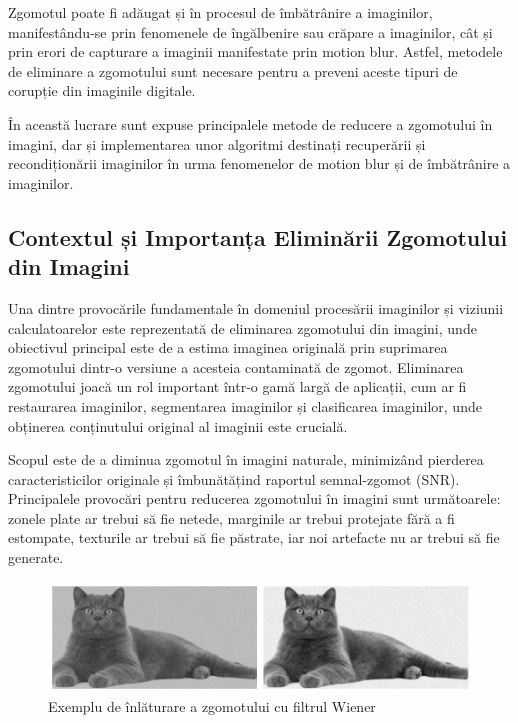 \documentclass[12pt]{article}
\begin{document}
Zgomotul poate fi adăugat și în procesul de îmbătrânire a imaginilor, manifestându-se prin fenomenele de îngălbenire sau crăpare a imaginilor, cât și prin erori de capturare a imaginii manifestate prin motion blur. Astfel, metodele de eliminare a zgomotului sunt necesare pentru a preveni aceste tipuri de corupție din imaginile digitale.

În această lucrare sunt expuse principalele metode de reducere a zgomotului în imagini, dar și implementarea unor algoritmi destinați recuperării și recondiționării imaginilor în urma fenomenelor de motion blur și de îmbătrânire a imaginilor.

\subsection{Contextul și Importanța Eliminării Zgomotului din Imagini}

\indent Una dintre provocările fundamentale în domeniul procesării imaginilor și viziunii calculatoarelor este reprezentată de eliminarea zgomotului din imagini, unde obiectivul principal este de a estima imaginea originală prin suprimarea zgomotului dintr-o versiune a acesteia contaminată de zgomot. Eliminarea zgomotului joacă un rol important într-o gamă largă de aplicații, cum ar fi restaurarea imaginilor, segmentarea imaginilor și clasificarea imaginilor, unde obținerea conținutului original al imaginii este crucială.

\indent Scopul este de a diminua zgomotul în imagini naturale, minimizând pierderea caracteristicilor originale și îmbunătățind raportul semnal-zgomot (SNR). Principalele provocări pentru reducerea zgomotului în imagini sunt următoarele: zonele plate ar trebui să fie netede, marginile ar trebui protejate fără a fi estompate, texturile ar trebui să fie păstrate, iar noi artefacte nu ar trebui să fie generate.

\begin{figure}[h]
    \centering
    \includegraphics[width=1\textwidth]{images/img1.png}
    \caption{Exemplu de înlăturare a zgomotului cu filtrul Wiener}
    \label{fig:img1}
    \vspace{10pt}
\end{figure}
\end{document}
